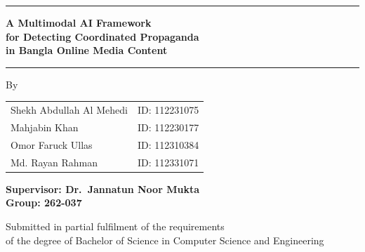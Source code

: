 \documentclass[12pt,a4paper]{report}
\begin{document}

\begin{titlepage}

\begin{center}

\noindent\rule{\textwidth}{1pt}

\vspace{0.8cm}

{\LARGE\bfseries
A Multimodal AI Framework\\[0.35em]
for Detecting Coordinated Propaganda\\[0.35em]
in Bangla Online Media Content\\[0.35em]
}

\vspace{0.8cm}

\noindent\rule{\textwidth}{1pt}

\end{center}

\vfill

\begin{center}
By
\end{center}

\vfill

\begin{center}

\begin{tabular}{l l}
Shekh Abdullah Al Mehedi & ID: 112231075 \\
Mahjabin Khan            & ID: 112230177 \\
Omor Faruck Ullas        & ID: 112310384 \\
Md. Rayan Rahman         & ID: 112331071
\end{tabular}

\end{center}

\vfill

\begin{center}
{\large\bfseries
Supervisor: Dr.\ Jannatun Noor Mukta\\[0.3em]
Group: 262-037
}
\end{center}

\vfill

\begin{center}
Submitted in partial fulfilment of the requirements\\
of the degree of Bachelor of Science in Computer Science and Engineering
\end{center}


\end{titlepage}
\end{document}
